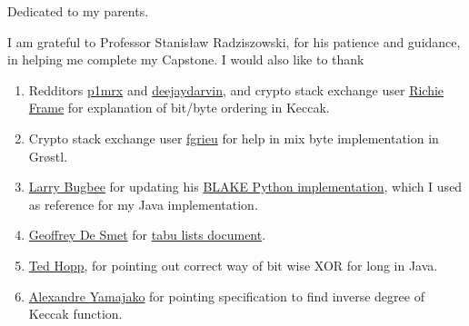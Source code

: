 \documentclass[12pt,american]{report}
\theoremstyle{plain}
\theoremstyle{definition}
\begin{document}
\beforepreface%

\vfill
\begin{center}
Dedicated to my parents.
\end{center}
\vfill

%
\vfill
I am grateful to Professor Stanis{\l}aw Radziszowski, for his patience and guidance, in helping me
complete my Capstone. \newline \newline
I would also like to thank 
\begin{enumerate}
\item Redditors \href{"http://www.reddit.com/user/p1mrx"}{p1mrx} and 
\href{"http://www.reddit.com/user/deejaydarvin"}{deejaydarvin}, and crypto stack exchange user 
\href{"http://crypto.stackexchange.com/users/8050/richie-frame"}{Richie Frame} for explanation of bit/byte 
ordering in Keccak.
\item Crypto stack exchange user \href{"http://crypto.stackexchange.com/users/555/fgrieu"}{fgrieu} for help
in mix byte implementation in Gr{\o}stl.
\item \href{"http://www.seanet.com/~bugbee"}{Larry Bugbee} for updating his 
\href{http://www.seanet.com/~bugbee/crypto/blake/}{BLAKE Python implementation}, which I used as reference 
for my Java implementation.
\item \href{"http://stackoverflow.com/users/472109/geoffrey-de-smet"}{Geoffrey De Smet} for 
\href{"http://docs.jboss.org/drools/release/latest/optaplanner-docs/html\_single/index.html\#tabuSearch"}
{tabu lists document}.
\item \href{"http://stackoverflow.com/users/535871/ted-hopp"}{Ted Hopp}, for pointing out correct way
of bit wise XOR for long in Java.
\item \href{"http://crypto.stackexchange.com/users/4136/alexandre-yamajako"}{Alexandre Yamajako} for pointing
specification to find inverse degree of Keccak function.
\end{enumerate}
\vfill
\end{document}
